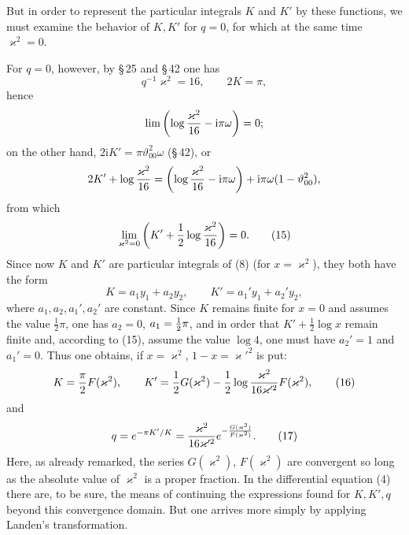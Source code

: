 \documentclass[11pt]{article}
\providecommand{\tht}{\vartheta}
\providecommand{\ii}{\mathrm{i}}
\begin{document}
But in order to represent the particular integrals $K$ and $K'$ by these functions, we must examine the behavior of $K,K'$ for $q=0$, for which at the same time $\varkappa^2=0$.

For $q=0$, however, by \S\,25 and \S\,42 one has
\[
q^{-1}\varkappa^2=16,
\qquad
2K=\pi,
\]
hence
\[
\lim\left(\log{\varkappa^2\over16}-\ii\pi\omega\right)=0;
\]
on the other hand, $2\ii K'=\pi\tht_{00}^2\omega$ (\S\,42), or
\[
2K'+\log{\varkappa^2\over16}=\left(\log{\varkappa^2\over16}-\ii\pi\omega\right)+\ii\pi\omega(1-\tht_{00}^2),
\]
from which
\begin{equation}
\lim_{\varkappa^2=0}\left(K'+{1\over2}\log{\varkappa^2\over16}\right)=0.
\tag{15}
\end{equation}
Since now $K$ and $K'$ are particular integrals of (8) (for $x=\varkappa^2$), they both have the form
\[
K=a_1y_1+a_2y_2,
\qquad
K'=a_1'y_1+a_2'y_2,
\]
where $a_1,a_2,a_1',a_2'$ are constant. Since $K$ remains finite for $x=0$ and assumes the value $\frac12\pi$, one has $a_2=0$, $a_1={1\over2}\pi$, and in order that $K'+\frac12\log x$ remain finite and, according to (15), assume the value $\log4$, one must have $a_2'=1$ and $a_1'=0$. Thus one obtains, if $x=\varkappa^2$, $1-x=\varkappa'^2$ is put:
\begin{equation}
K={\pi\over2}F(\varkappa^2),
\qquad
K'={1\over2}G(\varkappa^2)-{1\over2}\log{\varkappa^2\over16\varkappa'^2}F(\varkappa^2),
\tag{16}
\end{equation}
and
\begin{equation}
q=e^{-\pi K'/K}={\varkappa^2\over16\varkappa'^2}
 e^{-{G(\varkappa^2)\over F(\varkappa^2)}}.
\tag{17}
\end{equation}
Here, as already remarked, the series $G(\varkappa^2)$, $F(\varkappa^2)$ are convergent so long as the absolute value of $\varkappa^2$ is a proper fraction. In the differential equation (4) there are, to be sure, the means of continuing the expressions found for $K,K',q$ beyond this convergence domain. But one arrives more simply by applying Landen's transformation.
\end{document}
